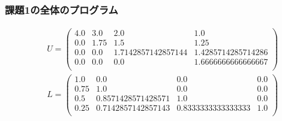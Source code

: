 \documentclass[uplatex, dvipdfmx, a4j,11pt]{jsarticle}
\begin{document}
\subsubsection*{課題1の全体のプログラム}
\begin{eqnarray*}
  &&U =
  \begin{pmatrix}
    4.0 & 3.0 & 2.0 & 1.0\\
    0.0 & 1.75 & 1.5 & 1.25\\
    0.0 & 0.0 & 1.7142857142857144 & 1.4285714285714286\\
    0.0 & 0.0 & 0.0 & 1.6666666666666667\\
  \end{pmatrix}\\
  &&L =
  \begin{pmatrix}
    1.0 & 0.0 & 0.0 & 0.0\\
    0.75 & 1.0 & 0.0 & 0.0\\
    0.5 & 0.8571428571428571 & 1.0 & 0.0\\
    0.25 & 0.7142857142857143 & 0.8333333333333333 & 1.0\\
  \end{pmatrix}\\
\end{eqnarray*}
\end{document}
